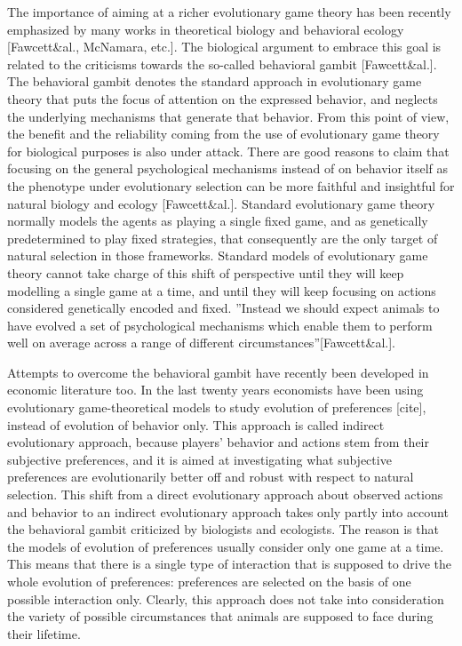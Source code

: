 \documentclass[fleqn,reqno,11pt]{article}
\begin{document}
The importance of aiming at a richer evolutionary game theory has been recently emphasized by many works in theoretical biology and behavioral ecology [Fawcett\&al., McNamara, etc.]. The biological argument to embrace this goal is related to the criticisms towards the so-called behavioral gambit [Fawcett\&al.]. The behavioral gambit denotes the standard approach in evolutionary game theory that puts the focus of attention on the expressed behavior, and neglects the underlying mechanisms that generate that behavior. From this point of view, the benefit and the reliability coming from the use of evolutionary game theory for biological purposes is also under attack. There are good reasons to claim that focusing on the general psychological mechanisms instead of on behavior itself as the phenotype under evolutionary selection can be more faithful and insightful for natural biology and ecology [Fawcett\&al.].
Standard evolutionary game theory normally models the agents as playing a single fixed game, and as genetically predetermined to play fixed strategies, that consequently are the only target of natural selection in those frameworks. Standard models of evolutionary game theory cannot take charge of this shift of perspective until they will keep modelling a single game at a time, and until they will keep focusing on actions considered genetically encoded and fixed. ''Instead we should expect animals to have evolved a set of psychological mechanisms which enable them to perform well on average across a range of different circumstances''[Fawcett\&al.].

Attempts to overcome the behavioral gambit have recently been developed in economic literature too. In the last twenty years economists have been using evolutionary game-theoretical models to study evolution of preferences [cite], instead of evolution of behavior only. This approach is called indirect evolutionary approach, because players' behavior and actions stem from their subjective preferences, and it is aimed at investigating what subjective preferences are evolutionarily better off and robust with respect to natural selection. This shift from a direct evolutionary approach about observed actions and behavior to an indirect evolutionary approach takes only partly into account the behavioral gambit criticized by biologists and ecologists. The reason is that the models of evolution of preferences usually consider only one game at a time. This means that there is a single type of interaction that is supposed to drive the whole evolution of preferences: preferences are selected on the basis of one possible interaction only. Clearly, this approach does not take into consideration the variety of possible circumstances that animals are supposed to face during their lifetime. 
\end{document}
